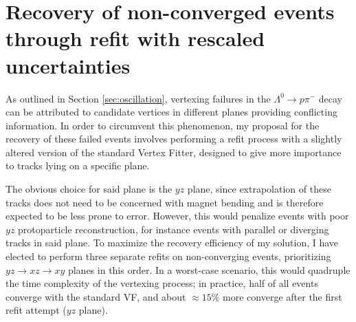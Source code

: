 \section[Recovery of non-converged events]{Recovery of non-converged events through refit with rescaled uncertainties}
\label{sec:recovery_general}
\label{sec:blowup_matrix}



As outlined in Section \ref{sec:oscillation}, vertexing failures in the $\Lambda^0 \rightarrow p\pi^-$ decay can be attributed to candidate vertices in different planes providing conflicting information.
In order to circumvent this phenomenon, my proposal for the recovery of these failed events involves performing a refit process with a slightly altered version of the standard Vertex Fitter, designed to give more importance to tracks lying on a specific plane.

The obvious choice for said plane is the $yz$ plane, since extrapolation of these tracks does not need to be concerned with magnet bending and is therefore expected to be less prone to error.
However, this would penalize events with poor $yz$ protoparticle reconstruction, for instance events with parallel or diverging tracks in said plane.
To maximize the recovery efficiency of my solution, I have elected to perform three separate refits on non-converging events, prioritizing $yz \rightarrow xz \rightarrow xy$ planes in this order.
In a worst-case scenario, this would quadruple the time complexity of the vertexing process; in practice, half of all events converge with the standard VF, and about $\approx 15\%$ more converge after the first refit attempt ($yz$ plane).

